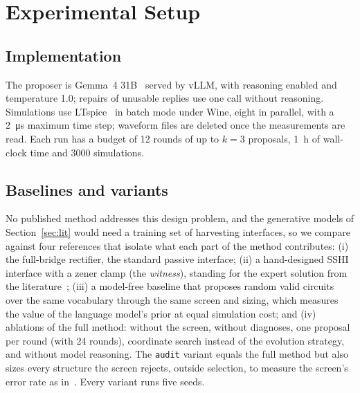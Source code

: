 \documentclass[journal]{IEEEtran}
\begin{document}
\section{Experimental Setup}\label{sec:setup}
\subsection{Implementation}
The proposer is Gemma~4 31B~\cite{gemma4} served by vLLM, with reasoning enabled and temperature 1.0;
repairs of unusable replies use one call without reasoning. Simulations use LTspice~\cite{ltspice} in
batch mode under Wine, eight in parallel, with a \SI{2}{\micro s} maximum time step; waveform files are
deleted once the measurements are read. Each run has a budget of 12 rounds of up to $k=3$ proposals,
\SI{1}{h} of wall-clock time and 3000 simulations.

\subsection{Baselines and variants}
No published method addresses this design problem, and the generative models of
Section~\ref{sec:lit} would need a training set of harvesting interfaces, so we compare against four
references that isolate what each part of the method contributes:
(i) the full-bridge rectifier, the standard passive interface;
(ii) a hand-designed SSHI interface with a zener clamp (the \emph{witness}), standing for the expert
solution from the literature~\cite{guyomar2005sshi};
(iii) a model-free baseline that proposes random valid circuits over the same vocabulary through the same
screen and sizing, which measures the value of the language model's prior at equal simulation cost; and
(iv) ablations of the full method: without the screen, without diagnoses, one proposal per round (with 24
rounds), coordinate search instead of the evolution strategy, and without model reasoning. The
\texttt{audit} variant equals the full method but also sizes every structure the screen rejects, outside
selection, to measure the screen's error rate as in~\cite{zhao2022drl}. Every variant runs five seeds.
\end{document}
